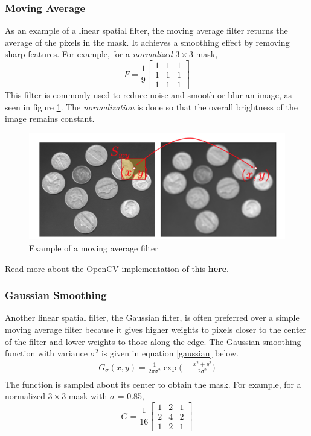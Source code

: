 \documentclass[twoside]{article}
\begin{document}
\subsubsection{Moving Average}
As an example of a linear spatial filter, the moving average filter returns the average of the pixels in the mask. It achieves a smoothing effect by removing sharp features. For example, for a \textit{normalized} $3\times3$ mask,
\[
F = \frac{1}{9}
\begin{bmatrix}
1 & 1 & 1\\
1 & 1 & 1\\
1 & 1 & 1
\end{bmatrix}
\]
This filter is commonly used to reduce noise and smooth or blur an image, as seen in figure \ref{movag}. The \textit{normalization} is done so that the overall brightness of the image remains constant. 
\begin{figure}[h]
  \centering
  \includegraphics[scale=.4]{blur.png}
    \caption{Example of a moving average filter}
    \label{movag}
\end{figure}

Read more about the OpenCV implementation of this  \href{https://docs.opencv.org/3.1.0/d4/d86/group__imgproc__filter.html#ga8c45db9afe636703801b0b2e440fce37}{\textbf{here}.} 

\subsubsection{Gaussian Smoothing}
Another linear spatial filter, the Gaussian filter, is often preferred over a simple moving average filter because it gives higher weights to pixels closer to the center of the filter and lower weights to those along the edge. The Gaussian smoothing function with variance $\sigma^2$ is given in equation \ref{gaussian} below.
\begin{equation}
  \label{gaussian}
  \begin{aligned}
    G_\sigma(x,y) = \frac{1}{2\pi\sigma^2} \exp \bigg(-\frac{x^2 + y^2}{2\sigma^2} \bigg)\\
  \end{aligned}
\end{equation}
The function is sampled about its center to obtain the mask. For example, for a normalized $3\times3$ mask with $\sigma$ = 0.85,
\[
G = \frac{1}{16}
\begin{bmatrix}
1 & 2 & 1\\
2 & 4 & 2\\
1 & 2 & 1
\end{bmatrix}
\]
\end{document}
